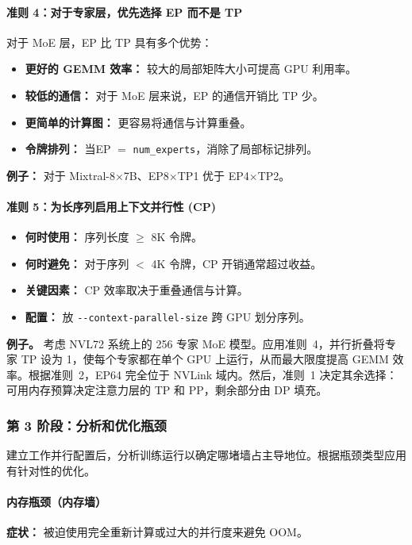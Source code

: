 \documentclass[10pt,logo,copyright]{nvidiatechreport_zh}
\begin{document}
\paragraph*{准则 4：对于专家层，优先选择 EP 而不是 TP}
对于 MoE 层，EP 比 TP 具有多个优势：
\begin{itemize}
    \item \textbf{更好的 GEMM 效率：} 较大的局部矩阵大小可提高 GPU 利用率。
    \item \textbf{较低的通信：} 对于 MoE 层来说，EP 的通信开销比 TP 少。
    \item \textbf{更简单的计算图：} 更容易将通信与计算重叠。
    \item \textbf{令牌排列：} 当EP $=$ \texttt{num\_experts}，消除了局部标记排列。
\end{itemize}

\noindent\textbf{例子：} 对于 Mixtral-8$\times$7B、EP8$\times$TP1 优于 EP4$\times$TP2。

\paragraph*{准则 5：为长序列启用上下文并行性 (CP)}
\begin{itemize}
    \item \textbf{何时使用：} 序列长度 $\geq$ 8K 令牌。
    \item \textbf{何时避免：} 对于序列 $<$ 4K 令牌，CP 开销通常超过收益。
    \item \textbf{关键因素：} CP 效率取决于重叠通信与计算。
    \item \textbf{配置：} 放 \texttt{-{}-context-parallel-size} 跨 GPU 划分序列。
\end{itemize}

\noindent\textbf{例子。} 考虑 NVL72 系统上的 256 专家 MoE 模型。应用准则~4，并行折叠将专家 TP 设为 1，使每个专家都在单个 GPU 上运行，从而最大限度提高 GEMM 效率。根据准则~2，EP64 完全位于 NVLink 域内。然后，准则~1 决定其余选择：可用内存预算决定注意力层的 TP 和 PP，剩余部分由 DP 填充。

\subsubsection{第 3 阶段：分析和优化瓶颈}

建立工作并行配置后，分析训练运行以确定哪堵墙占主导地位。根据瓶颈类型应用有针对性的优化。

\paragraph*{内存瓶颈（内存墙）}
\textbf{症状：} 被迫使用完全重新计算或过大的并行度来避免 OOM。
\end{document}

